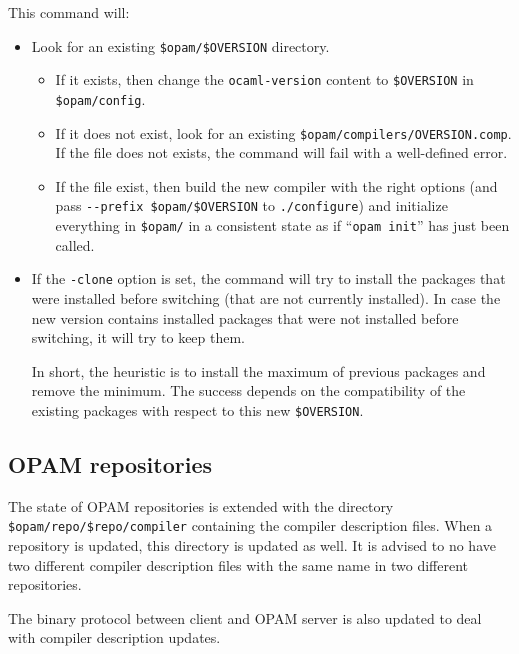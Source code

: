\documentclass[a4paper,11pt]{article}
\begin{document}
This command will:

\begin{itemize}
\item Look for an existing \verb+$opam/$OVERSION+ directory. 

\begin{itemize}
\item If it
  exists, then change the {\tt ocaml-version} content to
  \verb+$OVERSION+ in  \verb+$opam/config+.

\item If it does not exist, look for an existing
  \verb+$opam/compilers/OVERSION.comp+. If the file does not exists,
  the command will fail with a well-defined error.

\item If the file exist, then build the new compiler with the right
  options (and pass \verb+--prefix $opam/$OVERSION+ to
  \verb+./configure+) and initialize everything in \verb+$opam/+ 
  in a consistent state as if ``\verb+opam init+'' has just been called.

\end{itemize}
\item If the \verb+-clone+ option is set, the command will try to install
  the packages that were installed before switching 
  (that are not currently installed).
  In case the new version contains installed packages 
  that were not installed before switching, it will try to keep them.

  In short, the heuristic is to install the maximum of previous packages 
  and remove the minimum.
  The success depends on the compatibility of the existing packages 
  with respect to this new \verb+$OVERSION+.

\end{itemize}

\subsection{OPAM repositories}

The state of OPAM repositories is extended with the directory
\verb+$opam/repo/$repo/compiler+ containing the compiler description
files. When a repository is updated, this directory is updated as
well. It is advised to no have two different compiler description
files with the same name in two different repositories.

The binary protocol between client and OPAM server is also updated to
deal with compiler description updates.
\end{document}

